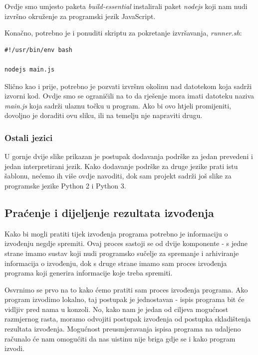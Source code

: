 \documentclass[times, utf8, zavrsni]{fer}
\begin{document}
Ovdje smo umjesto paketa {\textit{build-essential}} instalirali paket {\textit{nodejs}} koji nam nudi izvršno okruženje za programski jezik JavaScript.

Konačno, potrebno je i ponuditi skriptu za pokretanje izvršavanja, {\textit{runner.sh}}:

\begin{lstlisting}
#!/usr/bin/env bash

nodejs main.js
\end{lstlisting}

Slično kao i prije, potrebno je pozvati izvršnu okolinu nad datotekom koja sadrži izvorni kod. Ovdje smo se ograničili na to da rješenje mora imati datoteku naziva {\textit{main.js}} koja sadrži ulaznu točku u program. Ako bi ovo htjeli promijeniti, dovoljno je doraditi ovu sliku, ili na temelju nje napraviti drugu.

\subsubsection{Ostali jezici}

U gornje dvije slike prikazan je postupak dodavanja podrške za jedan prevedeni i jedan interpretirani jezik. Kako dodavanje podrške za druge jezike prati istu šablonu, nećemo ih više ovdje navoditi, dok sam projekt sadrži još slike za programske jezike Python 2 i Python 3.

\subsection{Praćenje i dijeljenje rezultata izvođenja}

Kako bi mogli pratiti tijek izvođenja programa potrebno je informaciju o izvođenju negdje spremiti. Ovaj proces sastoji se od dvije komponente - s jedne strane imamo sustav koji nudi programsko sučelje za spremanje i arhiviranje informacija o izvođenju, dok s druge strane imamo sam proces izvođenja programa koji generira informacije koje treba spremiti.

Osvrnimo se prvo na to kako ćemo pratiti sam proces izvođenja programa. Ako program izvodimo lokalno, taj postupak je jednostavan - ispis programa bit će vidljiv pred nama u konzoli. No, kako nam je jedan od ciljeva mogućnost razmjernog rasta, moramo odvojiti postupak izvođenja od postupka skladištenja rezultata izvođenja. Mogućnost preusmjeravanja ispisa programa na udaljeno računalo će nam omogućiti da nas uistinu nije briga gdje se i kako program izvodi.
\end{document}
